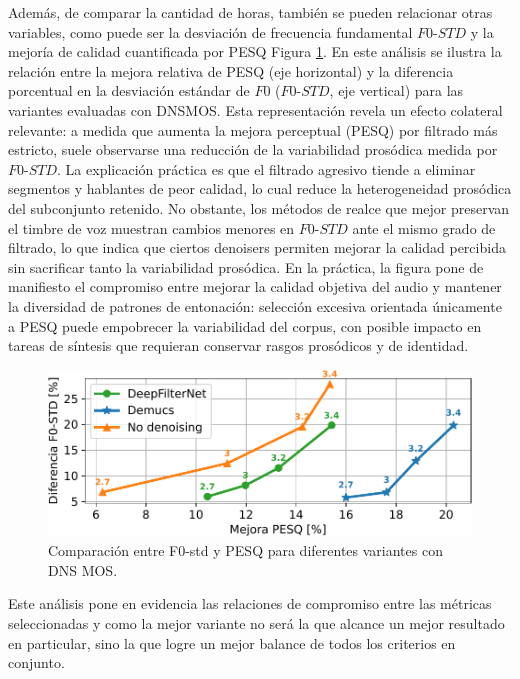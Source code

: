 Además, de comparar la cantidad de horas, también se pueden relacionar otras variables, como puede ser la desviación de frecuencia fundamental \(F0\text{-}STD\) y la mejoría de calidad cuantificada por PESQ Figura \ref{fig:F0_vs_PESQ}. En este análisis se ilustra la relación entre la mejora relativa de PESQ (eje horizontal) y la diferencia porcentual en la desviación estándar de \(F0\) (\(F0\text{-}STD\), eje vertical) para las variantes evaluadas con DNSMOS. Esta representación revela un efecto colateral relevante: a medida que aumenta la mejora perceptual (PESQ) por filtrado más estricto, suele observarse una reducción de la variabilidad prosódica medida por \(F0\text{-}STD\). La explicación práctica es que el filtrado agresivo tiende a eliminar segmentos y hablantes de peor calidad, lo cual reduce la heterogeneidad prosódica del subconjunto retenido. No obstante, los métodos de realce que mejor preservan el timbre de voz muestran cambios menores en \(F0\text{-}STD\) ante el mismo grado de filtrado, lo que indica que ciertos denoisers permiten mejorar la calidad percibida sin sacrificar tanto la variabilidad prosódica. En la práctica, la figura pone de manifiesto el compromiso entre mejorar la calidad objetiva del audio y mantener la diversidad de patrones de entonación: selección excesiva orientada únicamente a PESQ puede empobrecer la variabilidad del corpus, con posible impacto en tareas de síntesis que requieran conservar rasgos prosódicos y de identidad.

\begin{figure}[h]
  \centering
  \centerline{\includegraphics[width=12cm]{Figuras/Pipeline/F0-STD vs PESQ (dnsmos).pdf}}
  \caption{Comparación entre F0-std y PESQ para diferentes variantes con DNS MOS.}
    \label{fig:F0_vs_PESQ}
\end{figure}

Este análisis pone en evidencia las relaciones de compromiso entre las métricas seleccionadas y como la mejor variante no será la que alcance un mejor resultado en particular, sino la que logre un mejor balance de todos los criterios en conjunto.


